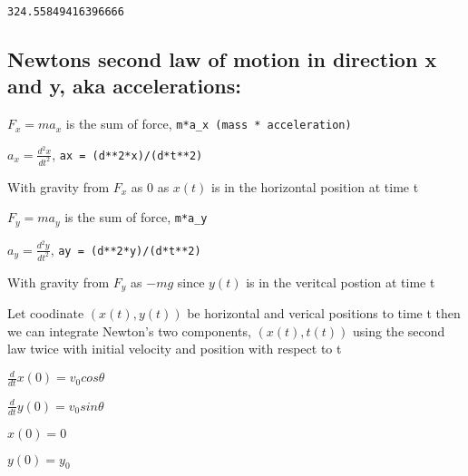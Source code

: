 \documentclass[11pt]{article}
\newcommand{\prompt}[4]{
        \llap{{\color{#2}[#3]: #4}}\vspace{-1.25em}
    }
\begin{document}
            \begin{tcolorbox}[breakable, boxrule=.5pt, size=fbox, pad at break*=1mm, opacityfill=0]
\prompt{Out}{outcolor}{94}{\hspace{3.5pt}}
\begin{Verbatim}[commandchars=\\\{\}]
324.55849416396666
\end{Verbatim}
\end{tcolorbox}
        
    \hypertarget{newtons-second-law-of-motion-in-direction-x-and-y-aka-accelerations}{%
\subsection{Newtons second law of motion in direction x and y, aka
accelerations:}\label{newtons-second-law-of-motion-in-direction-x-and-y-aka-accelerations}}

\(F_x = ma_x\) is the sum of force,
\texttt{m*a\_x\ (mass\ *\ acceleration)}

\(a_x = \frac {d^{2}x}{dt^{2}}\), \texttt{ax\ =\ (d**2*x)/(d*t**2)}

With gravity from \(F_x\) as 0 as \(x(t)\) is in the horizontal position
at time t

\(F_y = ma_y\) is the sum of force, \texttt{m*a\_y}

\(a_y = \frac {d^{2}y}{dt^{2}}\), \texttt{ay\ =\ (d**2*y)/(d*t**2)}

With gravity from \(F_y\) as \(-mg\) since \(y(t)\) is in the veritcal
postion at time t

Let coodinate \((x(t), y(t))\) be horizontal and verical positions to
time t then we can integrate Newton's two components, \((x(t), t(t))\)
using the second law twice with initial velocity and position with
respect to t

\(\frac{d}{dt}x(0)=v_0 cos\theta\)

\(\frac{d}{dt}y(0)=v_0 sin\theta\)

\(x(0) = 0\)

\(y(0) = y_0\)
\end{document}
